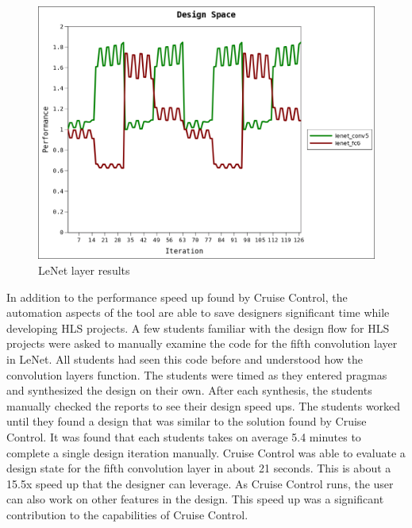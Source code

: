 \documentclass[letterpaper, 10 pt, conference]{IEEEconf}  %
\begin{document}
\begin{figure}[H]
\centering
\includegraphics[scale=.45]{result2.png} 
\caption{LeNet layer results}
\end{figure}


In addition to the performance speed up found by Cruise Control, the automation aspects of the tool are able to save designers significant time while developing HLS projects. A few students familiar with the design flow for HLS projects were asked to manually examine the code for the fifth convolution layer in LeNet. All students had seen this code before and understood how the convolution layers function. The students were timed as they entered pragmas and synthesized the design on their own. After each synthesis, the students manually checked the reports to see their design speed ups. The students worked until they found a design that was similar to the solution found by Cruise Control. It was found that each students takes on average 5.4 minutes to complete a single design iteration manually. Cruise Control was able to evaluate a design state for the fifth convolution layer in about 21 seconds. This is about a 15.5x speed up that the designer can leverage. As Cruise Control runs, the user can also work on other features in the design. This speed up was a significant contribution to the capabilities of Cruise Control. 
\end{document}
